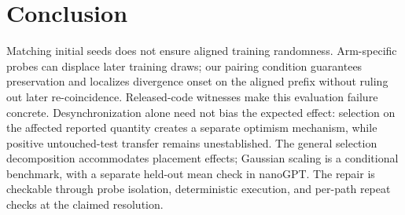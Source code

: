 \section{Conclusion}

Matching initial seeds does not ensure aligned training randomness.
Arm-specific probes can displace later training draws; our pairing
condition guarantees preservation and localizes divergence onset on the
aligned prefix without ruling out later re-coincidence.
Released-code witnesses make this evaluation failure concrete.
Desynchronization alone need not bias the expected effect: selection on
the affected reported quantity creates a separate optimism mechanism,
while positive untouched-test transfer remains unestablished.
The general selection decomposition accommodates placement effects;
Gaussian scaling is a conditional benchmark, with a separate held-out
mean check in nanoGPT. The repair is checkable through probe isolation,
deterministic execution, and per-path repeat checks at the claimed
resolution.

